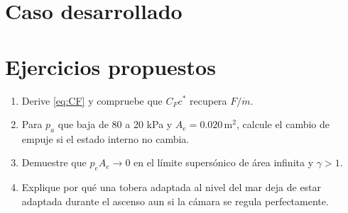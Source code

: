 \section{Caso desarrollado}

\par\noindent\begin{minipage}{\linewidth}
\section{Ejercicios propuestos}
\begin{enumerate}
\item Derive \eqref{eq:CF} y compruebe que $C_Fc^*$ recupera $F/\dot m$.
\item Para $p_a$ que baja de 80 a 20 kPa y $A_e=0.020\,\mathrm{m^2}$, calcule el cambio de empuje si el estado interno no cambia.
\item Demuestre que $p_eA_e\to0$ en el límite supersónico de área infinita y $\gamma>1$.
\item Explique por qué una tobera adaptada al nivel del mar deja de estar adaptada durante el ascenso aun si la cámara se regula perfectamente.
\end{enumerate}

\end{minipage}


\studiumchaptercheck
